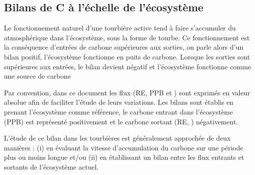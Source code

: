 \subsection{Bilans de C à l'échelle de l'écosystème}

Le fonctionnement naturel d'une tourbière active tend à faire s'accumuler du \coo atmosphérique dans l'écosystème, sous la forme de tourbe.
Ce fonctionnement est la conséquence d'entrées de carbone supérieures aux sorties, on parle alors d'un bilan positif, l'écosystème fonctionne en puits de carbone.
Lorsque les sorties sont supérieures aux entrées, le bilan devient négatif et l'écosystème fonctionne comme une source de carbone

Par convention, dans ce document les flux (RE, PPB et \fchh) sont exprimés en valeur absolue afin de faciliter l'étude de leurs variations.
Les bilans sont établis en prenant l'écosystème comme référence, le carbone entrant dans l'écosystème (PPB) est représenté positivement et le carbone sortant (RE, \fchh) négativement.

L'étude de ce bilan dans les tourbières est généralement approchée de deux manières : (i) en évaluant la vitesse d'accumulation du carbone sur une période plus ou moins longue et/ou (ii) en établissant un bilan entre les flux entrants et sortants de l'écosystème actuel.



